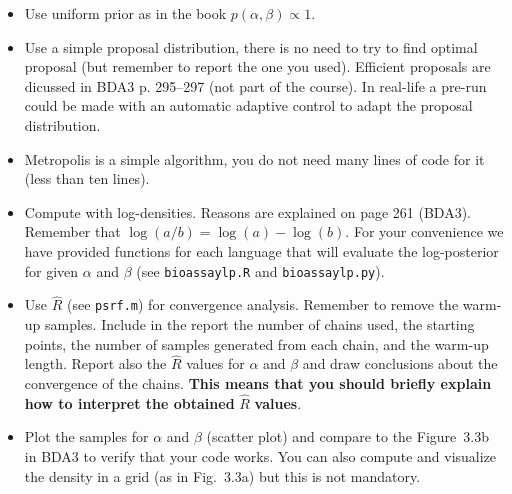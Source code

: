 \documentclass[a4paper,11pt]{article}
\begin{document}
\begin{itemize}
\item Use uniform prior as in the book $p(\alpha,\beta)\propto 1$.
\item Use a simple proposal distribution, there is no need to try to find optimal proposal (but remember to report the one you used). Efficient proposals are dicussed in BDA3 p. 295--297 (not part of the course). In real-life a pre-run could be made with an automatic adaptive control to adapt the proposal distribution.
\item Metropolis is a simple algorithm, you do not need many lines of
  code for it (less than ten lines). %
\item Compute with log-densities. Reasons are explained on page 261 (BDA3). Remember that $\log(a/b)=\log(a)-\log(b)$. For your convenience we have provided functions for each language that will evaluate the log-posterior for given $\alpha$ and $\beta$ (see {\tt bioassaylp.R} and {\tt bioassaylp.py}).
\item Use $\hat{R}$ (see {\tt psrf.m}) for convergence analysis. Remember to remove the warm-up samples. Include in the report the number of chains used, the starting points, the number of samples generated from each chain, and the warm-up length. Report also the $\hat R$ values for $\alpha$ and $\beta$ and draw conclusions about the convergence of the chains.
\textbf{This means that you should briefly explain how to interpret the obtained} $\hat R$ \textbf{values}.
\item Plot the samples for $\alpha$ and $\beta$ (scatter plot) and compare to the Figure~3.3b in BDA3 to verify that your code works. You can also compute and visualize the density in a grid (as in Fig.~3.3a) but this is not mandatory.
\end{itemize}
\end{document}
